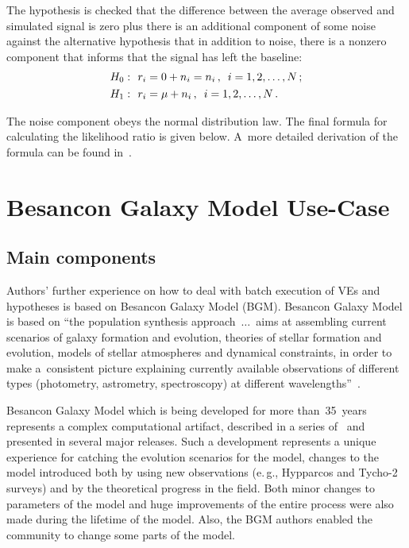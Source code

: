\begin{multicols}{2}
      The hypothesis is checked that the difference between the average observed 
and simulated signal is zero plus there is an additional component of some noise 
against the alternative hypothesis that in addition to noise, there is a nonzero 
component that informs that the signal has left the baseline:
      \begin{align*}
      H_0: &\ \ r_i=0+n_i=n_i\,,\enskip i=1,2,\ldots , N\,;\\
      H_1: &\ \ r_i=\mu+n_i\,,\enskip i=1,2,\ldots, N\,.
      \end{align*}
      
      The noise component obeys the normal distribution law. The final formula for 
calculating the likelihood ratio is given below. A~more detailed derivation of the 
formula can be found in~\cite{4-tar, 18-tar}.
      

\section{Besancon Galaxy Model Use-Case}

\subsection{Main components}

      \noindent
      Authors' further experience on how to deal with batch execution of 
VEs and hypotheses is based on Besancon Galaxy Model (BGM). Besancon Galaxy
Model is 
based on ``the population synthesis approach\ $\ldots$\ aims at assembling current 
scenarios of galaxy formation and evolution, theories of stellar formation and 
evolution, models of stellar atmospheres and dynamical constraints, in order to make 
a~consistent picture explaining currently available observations of different types 
(photometry, astrometry, spectroscopy) at different wavelengths''~\cite{21-tar}.
      
     Besancon Galaxy
Model which is being developed for more than~35~years represents a complex 
computational artifact, described in a series of~\cite{21-tar, 22-tar, 23-tar} and 
presented in several major releases. Such a development represents a unique 
experience for catching the evolution scenarios for the model, changes to the model 
introduced both by using new observations (e.\,g., Hypparcos and Tycho-2 surveys) 
and by the theoretical progress in the field. Both minor changes to parameters of the 
model and huge improvements of the entire process were also made during the 
lifetime of the model. Also, the BGM authors enabled the community to change some 
parts of the model.
      

\end{multicols}

